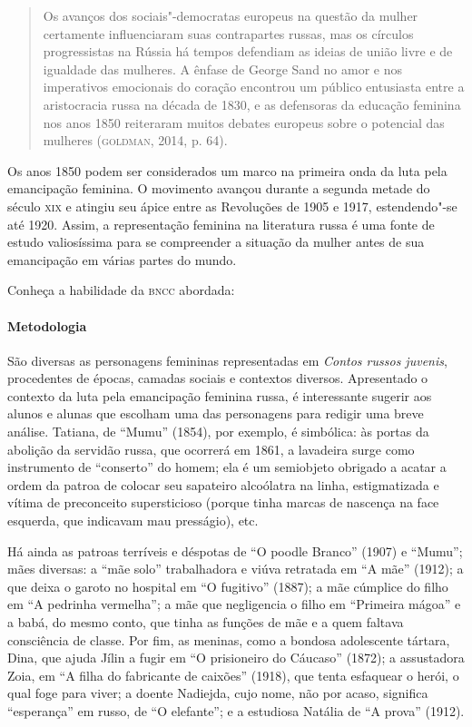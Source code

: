 \documentclass[11pt]{extarticle}
\begin{document}
\begin{quote}
Os avanços dos sociais"-democratas europeus na questão da mulher
certamente influenciaram suas contrapartes russas, mas os círculos
progressistas na Rússia há tempos defendiam as ideias de união livre e
de igualdade das mulheres. A ênfase de George Sand no amor e nos
imperativos emocionais do coração encontrou um público entusiasta entre
a aristocracia russa na década de 1830, e as defensoras da educação
feminina nos anos 1850 reiteraram muitos debates europeus sobre o
potencial das mulheres (\textsc{goldman}, 2014, p. 64).
\end{quote}

Os anos 1850 podem ser considerados um marco na primeira onda da luta
pela emancipação feminina. O movimento avançou durante a segunda metade
do século \textsc{xix} e atingiu seu ápice entre as Revoluções de 1905 e 1917,
estendendo"-se até 1920. Assim, a representação feminina na literatura
russa é uma fonte de estudo valiosíssima para se compreender a situação
da mulher antes de sua emancipação em várias partes do mundo.


Conheça a habilidade da \textsc{bncc} abordada:

\paragraph{Metodologia}
São diversas as personagens femininas representadas em \emph{Contos
russos juvenis}, procedentes de épocas, camadas sociais e contextos
diversos. Apresentado o contexto da luta pela emancipação feminina
russa, é interessante sugerir aos alunos e alunas que escolham uma das
personagens para redigir uma breve análise. Tatiana, de ``Mumu'' (1854),
por exemplo, é simbólica: às portas da abolição da servidão russa, que
ocorrerá em 1861, a lavadeira surge como instrumento de ``conserto'' do
homem; ela é um semiobjeto obrigado a acatar a ordem da patroa de
colocar seu sapateiro alcoólatra na linha, estigmatizada e vítima de
preconceito supersticioso (porque tinha marcas de nascença na face
esquerda, que indicavam mau presságio), etc. 


Há ainda as patroas
terríveis e déspotas de ``O poodle Branco'' (1907) e ``Mumu''; mães
diversas: a ``mãe solo'' trabalhadora e viúva retratada em ``A mãe''
(1912); a que deixa o garoto no hospital em ``O fugitivo'' (1887); a mãe
cúmplice do filho em ``A pedrinha vermelha''; a mãe que negligencia o
filho em ``Primeira mágoa'' e a babá, do mesmo conto, que tinha
as funções de mãe e a quem faltava consciência de classe. Por fim, as
meninas, como a bondosa adolescente tártara, Dina, que ajuda Jílin a
fugir em ``O prisioneiro do Cáucaso'' (1872); a assustadora Zoia,
em ``A filha do fabricante de caixões'' (1918), que tenta
esfaquear o herói, o qual foge para viver; a doente Nadiejda, cujo nome,
não por acaso, significa ``esperança'' em russo, de ``O
elefante''; e a estudiosa Natália de ``A prova'' (1912).
\end{document}

